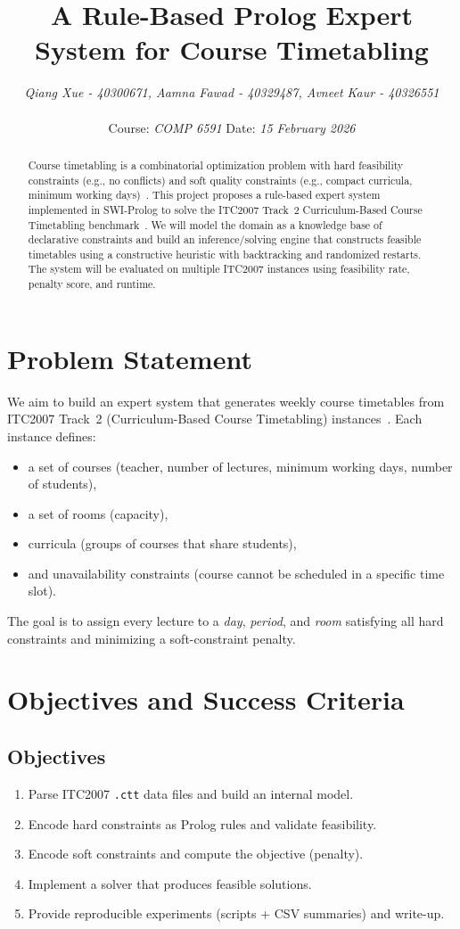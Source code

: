 \documentclass[11pt,letterpaper]{article}
\title{A Rule-Based Prolog Expert System for Course Timetabling}
\author{\textit{Qiang Xue - 40300671, Aamna Fawad - 40329487, Avneet Kaur - 40326551} \\\\
Course: \textit{COMP 6591} \quad\quad Date: \textit{15 February 2026}}
\date{}
\begin{document}
\maketitle

\begin{abstract}
Course timetabling is a combinatorial optimization problem with hard feasibility constraints (e.g., no conflicts) and soft quality constraints (e.g., compact curricula, minimum working days)~\cite{bettinelli2015overview}. This project proposes a rule-based expert system implemented in SWI-Prolog to solve the ITC2007 Track~2 Curriculum-Based Course Timetabling benchmark~\cite{itc2007}. We will model the domain as a knowledge base of declarative constraints and build an inference/solving engine that constructs feasible timetables using a constructive heuristic with backtracking and randomized restarts. The system will be evaluated on multiple ITC2007 instances using feasibility rate, penalty score, and runtime.
\end{abstract}

\section{Problem Statement}
We aim to build an expert system that generates weekly course timetables from ITC2007 Track~2 (Curriculum-Based Course Timetabling) instances~\cite{itc2007,de2022algorithm}. Each instance defines:
\begin{itemize}[nosep]
  \item a set of courses (teacher, number of lectures, minimum working days, number of students),
  \item a set of rooms (capacity),
  \item curricula (groups of courses that share students),
  \item and unavailability constraints (course cannot be scheduled in a specific time slot).
\end{itemize}
The goal is to assign every lecture to a \textit{day}, \textit{period}, and \textit{room} satisfying all hard constraints and minimizing a soft-constraint penalty.

\section{Objectives and Success Criteria}
\subsection{Objectives}
\begin{enumerate}[nosep]
  \item Parse ITC2007 \texttt{.ctt} data files and build an internal model.
  \item Encode hard constraints as Prolog rules and validate feasibility.
  \item Encode soft constraints and compute the objective (penalty).
  \item Implement a solver that produces feasible solutions.
  \item Provide reproducible experiments (scripts + CSV summaries) and write-up.
\end{enumerate}
\end{document}
